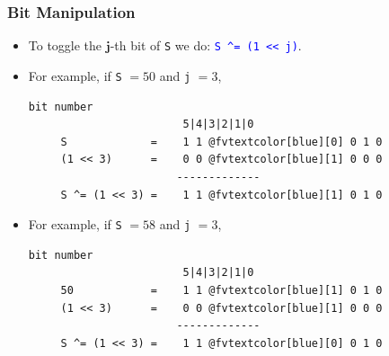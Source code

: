 \documentclass{beamer}
\begin{document}
\begin{frame}[fragile]
\frametitle{Bit Manipulation}

\scriptsize

\begin{itemize}

\item To toggle the $\mathbf{j}$-th bit of \verb+S+ we do: \textcolor{blue}{\texttt{S \textasciicircum= (1 << j)}}.

\vspace{0.1cm}

\item For example, if \verb+S+ $= 50$ and \verb+j+ $= 3$,

\begin{center}
\begin{Verbatim}[commandchars=@\[\]]
                         bit number
                        5|4|3|2|1|0
     S             =    1 1 @fvtextcolor[blue][0] 0 1 0
     (1 << 3)      =    0 0 @fvtextcolor[blue][1] 0 0 0
                       -------------
     S ^= (1 << 3) =    1 1 @fvtextcolor[blue][1] 0 1 0
\end{Verbatim}
\end{center}

\vspace{0.1cm}

\item For example, if \verb+S+ $= 58$ and \verb+j+ $= 3$,

\begin{center}
\begin{Verbatim}[commandchars=@\[\]]
                         bit number
                        5|4|3|2|1|0
     50            =    1 1 @fvtextcolor[blue][1] 0 1 0
     (1 << 3)      =    0 0 @fvtextcolor[blue][1] 0 0 0
                       -------------
     S ^= (1 << 3) =    1 1 @fvtextcolor[blue][0] 0 1 0
\end{Verbatim}
\end{center}

\end{itemize}

\end{frame}
\end{document}
